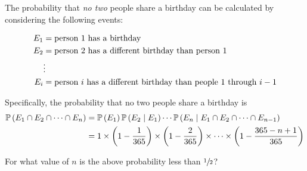 The probability that \emph{no two} people share a birthday can be calculated by
considering the following events:

\begin{align*}
    E_1 &= \hbox{person 1 has a birthday}\\
    E_2 &= \hbox{person 2 has a different birthday than person 1}\\
    \phantom{..}&\vdots\\
    E_i &= \hbox{person $i$ has a different birthday than people 1 through $i - 1$}
\end{align*}

Specifically, the probability that no two people share a birthday is
\begin{align*}\operatorname{\mathbb{P}}\left(E_1 \cap E_2 \cap \dots \cap E_n\right)
    &= \operatorname{\mathbb{P}}\left(E_1\right)\operatorname{\mathbb{P}}\left(E_2 \mid E_1\right)\cdots \operatorname{\mathbb{P}}\left(E_n \mid E_1 \cap E_2 \cap \dots \cap E_{n - 1}\right)\\
    &= 1 \times \left(1 - \frac{1}{365}\right) \times \left(1 - \frac{2}{365}\right) \times \cdots \times \left(1 - \frac{365 - n + 1}{365}\right) 
\end{align*}

For what value of $n$ is the above probability less than $\sfrac{1}{2}$?